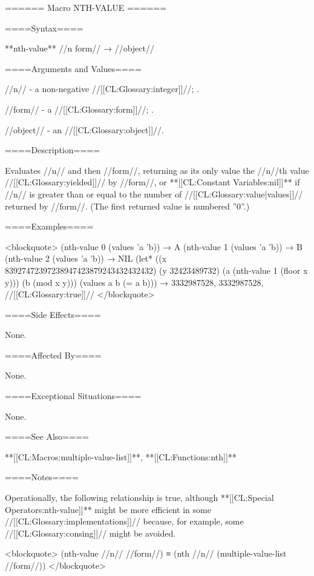 ====== Macro NTH-VALUE ======

====Syntax====

**nth-value** //n form// → //object//

====Arguments and Values====

//n// - a non-negative //[[CL:Glossary:integer]]//; \eval.

//form// - a //[[CL:Glossary:form]]//; \evalspecial.

//object// - an //[[CL:Glossary:object]]//.

====Description====

Evaluates //n// and then //form//, returning as its only value the //n//th value //[[CL:Glossary:yielded]]// by //form//, or **[[CL:Constant Variables:nil]]** if //n// is greater than or equal to the number of //[[CL:Glossary:value|values]]// returned by //form//. (The first returned value is numbered ''0''.)

====Examples====

<blockquote> (nth-value 0 (values 'a 'b)) → A (nth-value 1 (values 'a 'b)) → B (nth-value 2 (values 'a 'b)) → NIL (let* ((x 83927472397238947423879243432432432) (y 32423489732) (a (nth-value 1 (floor x y))) (b (mod x y))) (values a b (= a b))) → 3332987528, 3332987528, //[[CL:Glossary:true]]// </blockquote>

====Side Effects====

None.

====Affected By====

None.

====Exceptional Situations====

None.

====See Also====

**[[CL:Macros:multiple-value-list]]**, **[[CL:Functions:nth]]**

====Notes====

Operationally, the following relationship is true, although **[[CL:Special Operators:nth-value]]** might be more efficient in some //[[CL:Glossary:implementations]]// because, for example, some //[[CL:Glossary:consing]]// might be avoided.

<blockquote> (nth-value //n// //form//) ≡ (nth //n// (multiple-value-list //form//)) </blockquote>

